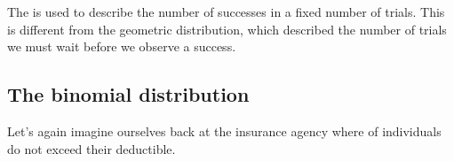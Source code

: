 The 
is used to describe
the number of successes in a fixed number of trials.
This is different from the geometric distribution,
which described the number of trials we must wait before
we observe a success.


\subsection{The binomial distribution}

\newcommand{\insureS}{\resp{not}}
\newcommand{\insureF}{\resp{exceed}}
\newcommand{\insureBinomCinDSingleScenario}{0.103}
\newcommand{\insureBinomCinD}{0.412}
\newcommand{\insureBinomEinHSingleScenario}{0.00454}
\newcommand{\insureBinomEinH}{0.254}
\newcommand{\insureBinomFourtyExpValue}{28}
\newcommand{\insureBinomFourtySD}{2.9}
\newcommand{\insureBinomFourtyLower}{22}
\newcommand{\insureBinomFourtyUpper}{34}

\noindent%
Let's again imagine ourselves back at the insurance agency
where \insureSperc{} of individuals do not exceed their
deductible.

